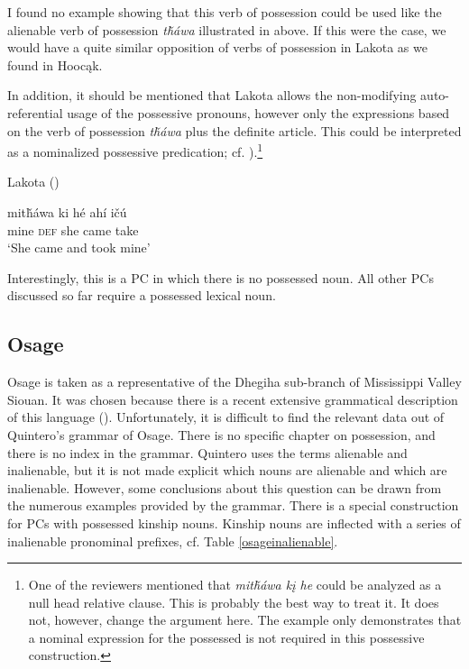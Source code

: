 \documentclass[output=paper]{LSP/langsci}
\begin{document}
I found no example showing that this verb of possession could be used like the alienable verb of possession \textit{t\v{h}\'awa} illustrated in  above. If this were the case, we would have a quite similar opposition of verbs of possession in Lakota as we found in Hoocąk. 

In addition, it should be mentioned that Lakota allows the non-modifying auto-referential usage of the possessive pronouns, however only the expressions based on the verb of possession \textit{t\v{h}\'awa} plus the definite article. This could be interpreted as a nominalized possessive predication; cf. ).\footnote{One of the reviewers mentioned that \textit{mit\v{h}áwa kį he} could be analyzed as a null head relative clause. This is probably the best way to treat it. It does not, however, change the argument here. The example only demonstrates that a nominal expression for the possessed is not required in this possessive construction.}

\ea	Lakota (\citealt[22]{Buechel1939}) \label{lakotatookmine}

\gll mit\v{h}áwa ki      h\'e   ahí     i\v{c}ú \\
mine        \textsc{def} she came take \\
\glt `She came and took mine'
\z

Interestingly, this is a PC in which there is no possessed noun. All other PCs discussed so far require a possessed lexical noun.

\subsection{Osage}
Osage is taken as a representative of the Dhegiha sub-branch of Mississippi Valley Siouan. It was chosen because there is a recent extensive grammatical description of this language (\citealt{Quintero2004}). Unfortunately, it is difficult to find the relevant data out of Quintero's grammar of Osage. There is no specific chapter on possession, and there is no index in the grammar. Quintero uses the terms alienable and inalienable, but it is not made explicit which nouns are alienable and which are inalienable. However, some conclusions about this question can be drawn from the numerous examples provided by the grammar.
There is a special construction for PCs with possessed kinship nouns. Kinship nouns are inflected with a series of inalienable pronominal prefixes, cf. Table \ref{osageinalienable}.
\end{document}
